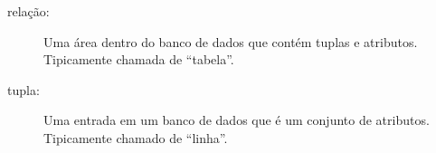 \begin{description}

\item[relação:] Uma área dentro do banco de dados que contém tuplas e
  atributos. Tipicamente chamada de ``tabela''.
  

\item[tupla:] Uma entrada em um banco de dados que é um conjunto de atributos.
  Tipicamente chamado de ``linha''.
\end{description}

